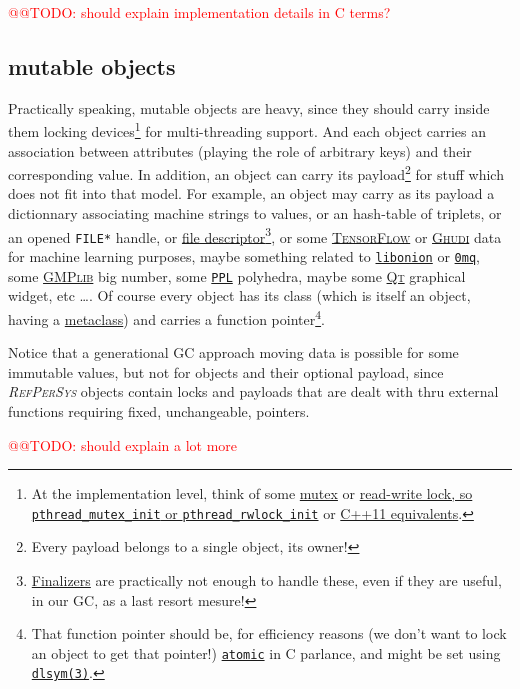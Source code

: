 \documentclass[11pt,a4paper,svgnames]{article}
\newcommand{\RefPerSys}{{\textit{\textsc{RefPerSys}}}}
\begin{document}
\textcolor{red}{@@TODO: should explain implementation details in C terms?}

\subsection{mutable objects}
\label{subsec:mutable-objects}

Practically speaking, mutable objects are heavy, since they should
carry inside them locking devices\footnote{At the implementation
level, think of some
\href{https://computing.llnl.gov/tutorials/pthreads/\#Mutexes}{mutex}
or
\href{http://tuxthink.blogspot.com/2013/02/using-read-write-lock-in-pthreads.html}{read-write
  lock, so
  \href{https://pubs.opengroup.org/onlinepubs/7908799/xsh/pthread\_mutex\_init.html}{\texttt{pthread\_mutex\_init}}
  or
  \href{https://pubs.opengroup.org/onlinepubs/7908799/xsh/pthread_rwlock_init.html}{\texttt{pthread\_rwlock\_init}}}
or \href{https://en.cppreference.com/w/cpp/thread}{C++11
  equivalents}.} for multi-threading support. And each object carries
an association between attributes (playing the role of arbitrary keys)
and their corresponding value. In addition, an object can carry its
payload\footnote{Every payload belongs to a single object, its owner!}
for stuff which does not fit into that model. For example, an object
may carry as its payload a dictionnary associating machine strings to
values, or an hash-table of triplets, or an opened \texttt{FILE*}
handle, or \href{https://en.wikipedia.org/wiki/File\_descriptor}{file
  descriptor}\footnote{\href{https://en.wikipedia.org/wiki/Finalizer}{Finalizers}
are practically not enough to handle these, even if they are useful,
in our GC, as a last resort mesure!}, or some
\href{https://www.tensorflow.org/}{\textsc{TensorFlow}} or
\href{https://gudhi.inria.fr/}{\textsc{Ghudi}} data for machine
learning purposes, maybe something related to
\href{https://github.com/davidmoreno/onion/}{\texttt{libonion}} or
\href{http://zeromq.org}{\texttt{0mq}}, some
\href{https://gmplib.org/}{\textsc{GMPlib}} big number, some
\href{https://www.bugseng.com/ppl}{\texttt{PPL}} polyhedra, maybe some
\href{http://qt.io/}{\textsc{Qt}} graphical widget, etc \ldots. Of
course every object has its class (which is itself an object, having a
\href{https://en.wikipedia.org/wiki/Metaclass}{metaclass}) and carries
a function pointer\footnote{That function pointer should be, for
efficiency reasons (we don't want to lock an object to get that
pointer!)
\href{https://en.cppreference.com/w/c/atomic}{\texttt{atomic}} in C
parlance, and might be set using
\href{http://man7.org/linux/man-pages/man3/dlsym.3.html}{\texttt{dlsym(3)}}.}.

Notice that a generational GC approach moving data is possible for
some immutable values, but not for objects and their optional payload,
since {\RefPerSys} objects contain locks and payloads that are dealt
with thru external functions requiring fixed, unchangeable, pointers.

\textcolor{red}{@@TODO: should explain a lot more}
\clearpage

\printnoidxglossaries

\bigskip

\printbibliography

\bigskip

\printindex
\end{document}
